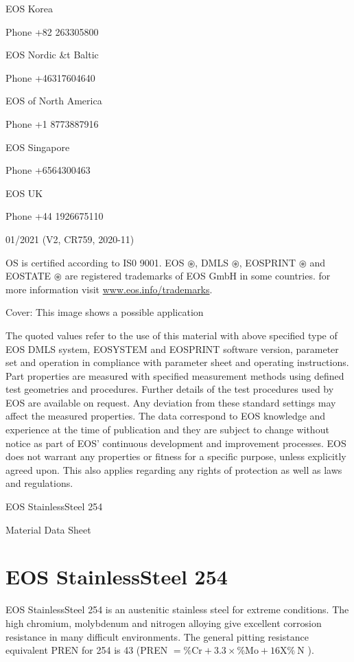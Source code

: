 \documentclass[10pt]{article}
\begin{document}
EOS Korea

Phone +82 263305800

EOS Nordic \&t Baltic

Phone +46317604640

EOS of North America

Phone +1 8773887916

EOS Singapore

Phone +6564300463

EOS UK

Phone +44 1926675110

01/2021 (V2, CR759, 2020-11)

OS is certified according to IS0 9001. EOS $\circledast$, DMLS $\circledast$, EOSPRINT $\circledast$ and EOSTATE $\circledast$ are registered trademarks of EOS GmbH in some countries. for more information visit \href{http://www.eos.info/trademarks}{www.eos.info/trademarks}.

Cover: This image shows a possible application

The quoted values refer to the use of this material with above specified type of EOS DMLS system, EOSYSTEM and EOSPRINT software version, parameter set and operation in compliance with parameter sheet and operating instructions. Part properties are measured with specified measurement methods using defined test geometries and procedures. Further details of the test procedures used by EOS are available on request. Any deviation from these standard settings may affect the measured properties. The data correspond to EOS knowledge and experience at the time of publication and they are subject to change without notice as part of EOS' continuous development and improvement processes. EOS does not warrant any properties or fitness for a specific purpose, unless explicitly agreed upon. This also applies regarding any rights of protection as well as laws and regulations.

EOS StainlessSteel 254

Material Data Sheet

\section*{EOS StainlessSteel 254}
EOS StainlessSteel 254 is an austenitic stainless steel for extreme conditions. The high chromium, molybdenum and nitrogen alloying give excellent corrosion resistance in many difficult environments. The general pitting resistance equivalent PREN for 254 is 43 (PREN $=\% \mathrm{Cr}+3.3 \times \% \mathrm{Mo}+16 \mathrm{X} \% \mathrm{~N}$ ).
\end{document}
